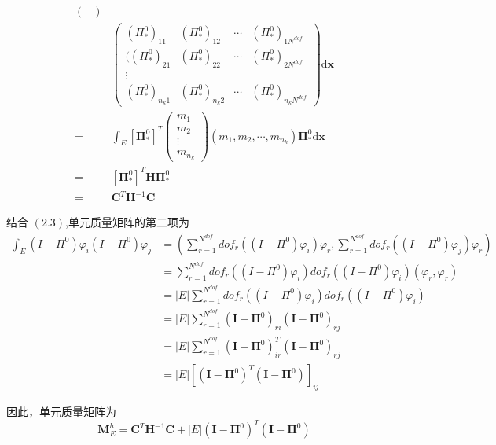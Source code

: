 \begin{equation*}
\begin{aligned}
\begin{pmatrix}
\end{pmatrix}\\
&\begin{pmatrix} 
(\Pi_{*}^{0})_{1 1} & (\Pi_{*}^{0})_{1 2} & \cdots  & (\Pi_{*}^{0})_{1 N^{dof}} \\ 
((\Pi_{*}^{0})_{2 1} & (\Pi_{*}^{0})_{2 2} & \cdots  & (\Pi_{*}^{0})_{2 N^{dof}} \\ 
\vdots\\
(\Pi_{*}^{0})_{n_k 1} & (\Pi_{*}^{0})_{n_k 2} & \cdots  & (\Pi_{*}^{0})_{n_k N^{dof}}
\end{pmatrix} \mathrm d \mathbf x\\
= & \int_E [\boldsymbol \Pi_{*}^0]^T \begin{pmatrix}
m_1 \\
m_2 \\
\vdots\\
m_{n_k}
\end{pmatrix}
(m_1, m_2, \cdots, m_{n_k}) \boldsymbol \Pi_{*}^{0} \mathrm d \mathbf x \\
= & [\boldsymbol \Pi_{*}^0]^T \mathbf{H} \boldsymbol \Pi_{*}^0 \\
= & \mathbf{C}^T\mathbf{H}^{-1}\mathbf{C}
\end{aligned}
\end{equation*}

结合 $(2.3)$,单元质量矩阵的第二项为 \\
\begin{equation}
\begin{aligned}
\int_{E}(I - \Pi^0)\varphi_i(I - \Pi^0)\varphi_j & = (\sum_{r = 1}^{N^{dof}}dof_r((I - \Pi^0)\varphi_i)\varphi_r, \sum_{r = 1}^{N^{dof}}dof_r((I - \Pi^0)\varphi_j)\varphi_r) \\
& = \sum_{r = 1}^{N^{dof}}dof_r((I - \Pi^0)\varphi_i)dof_r((I - \Pi^0)\varphi_i)(\varphi_r,\varphi_r) \\
& = |E|\sum_{r = 1}^{N^{dof}}dof_r((I - \Pi^0)\varphi_i)dof_r((I - \Pi^0)\varphi_i) \\
& = |E|\sum_{r = 1}^{N^{dof}}(\mathbf{I} - \boldsymbol \Pi^0)_{ri}(\mathbf{I} - \boldsymbol \Pi^0)_{rj} \\
& = |E|\sum_{r = 1}^{N^{dof}}(\mathbf{I} - \boldsymbol \Pi^0)_{ir}^T(\mathbf{I} - \boldsymbol \Pi^0)_{rj} \\
& = |E|\left[(\mathbf{I} - \boldsymbol \Pi^0)^T(\mathbf{I} - \boldsymbol \Pi^0)\right]_{ij}
\end{aligned}
\end{equation}

因此，单元质量矩阵为 \\
\begin{equation}
\mathbf M_E^h = \mathbf C^T\mathbf H^{-1}\mathbf C + |E|(\mathbf I - \boldsymbol \Pi^0)^T(\mathbf I - \boldsymbol \Pi^0)
\end{equation}


